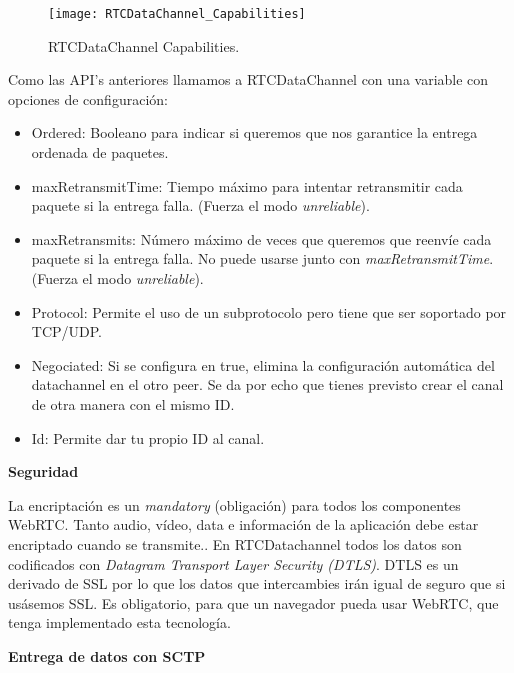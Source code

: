 \begin{figure}[htb]
\centering
\texttt{[image: RTCDataChannel\_Capabilities]}
\caption{RTCDataChannel Capabilities.}
\label{fig:datachannel_capabilities}
\end{figure}

\noindent Como las API's anteriores llamamos a RTCDataChannel con una variable con opciones de configuración:

\begin{itemize}
\item Ordered: Booleano para indicar si queremos que nos garantice la entrega ordenada de paquetes.
\item maxRetransmitTime: Tiempo máximo para intentar retransmitir cada paquete si la entrega falla. (Fuerza el modo \textit{unreliable}).
\item maxRetransmits: Número máximo de veces que queremos que reenvíe cada paquete si la entrega falla. No puede usarse junto con \textit{maxRetransmitTime}. (Fuerza el modo \textit{unreliable}).
\item Protocol: Permite el uso de un subprotocolo pero tiene que ser soportado por TCP/UDP.
\item Negociated: Si se configura en true, elimina la configuración automática del datachannel en el otro peer. Se da por echo que tienes previsto crear el canal de otra manera con el mismo ID.
\item Id: Permite dar tu propio ID al canal.
\end{itemize}

\begin{normalsize}
\noindent \textbf{Seguridad}\\
\end{normalsize}

La encriptación es un \textit{mandatory} (obligación) para todos los componentes WebRTC. Tanto audio, vídeo, data e información de la aplicación debe estar encriptado cuando se transmite.. En RTCDatachannel todos los datos son codificados con \textit{Datagram Transport Layer Security (DTLS)}. DTLS es un derivado de SSL por lo que los datos que intercambies irán igual de seguro que si usásemos SSL. Es obligatorio, para que un navegador pueda usar WebRTC, que tenga implementado esta tecnología.\\


\begin{normalsize}
\noindent \textbf{Entrega de datos con SCTP}\\
\end{normalsize}

